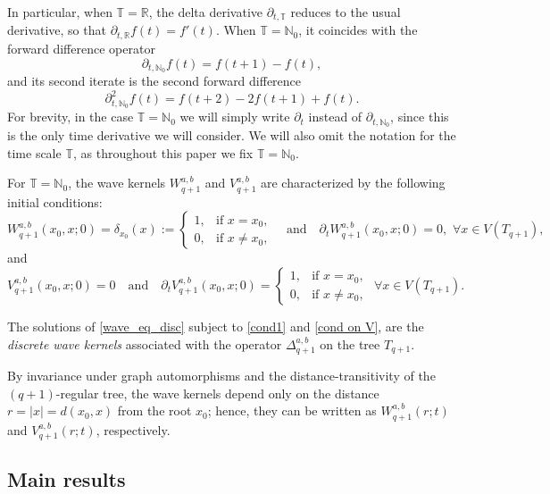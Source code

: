 \documentclass[12pt]{amsart}
\numberwithin{equation}{section}
\theoremstyle{boldremark}
\begin{document}
In particular, when $\mathbb{T} = \mathbb{R}$, the delta derivative $\partial_{t,\mathbb{T}}$ reduces to the usual derivative, so that $\partial_{t,\mathbb{R}} f(t) = f'(t)$. When $\mathbb{T} = \mathbb{N}_0$, it coincides with the forward difference operator
\[
\partial_{t,\mathbb{N}_0} f(t) = f(t+1) - f(t),
\]
and its second iterate is the second forward difference
\[
\partial_{t,\mathbb{N}_0}^2 f(t) = f(t+2) - 2f(t+1) + f(t).
\]
For brevity, in the case $\mathbb{T} = \mathbb{N}_0$ we will simply write $\partial_t$ instead of $\partial_{t,\mathbb{N}_0}$, since this is the only time derivative we will consider. We will also omit the notation for the time scale $\mathbb{T}$, as throughout this paper we fix $\mathbb{T} = \mathbb{N}_0$.

For $\mathbb{T}=\mathbb{N}_0$, the wave kernels $W_{q+1}^{a,b}$ and $V_{q+1}^{a,b}$ are characterized by the following initial conditions: 
\begin{equation}\label{cond1}
W_{q+1}^{a,b}(x_0, x; 0) =\delta_{x_0}(x):=
\begin{cases}
1, & \text{if } x = x_0, \\
0, & \text{if } x \neq x_0,
\end{cases} \quad \text{and}\quad \partial_t W_{q+1}^{a,b}(x_0, x; 0) = 0,\,\, \forall x\in V(T_{q+1}),
\end{equation}
and
\begin{equation}\label{cond on V}
V_{q+1}^{a,b}(x_0, x; 0) = 0 \quad \text{and}\quad  \partial_t  V_{q+1}^{a,b}(x_0, x; 0) =
\begin{cases}
1, & \text{if } x = x_0, \\
0, & \text{if } x \neq x_0,
\end{cases} \,\, \forall x\in V(T_{q+1}).
\end{equation}

The solutions of \eqref{wave_eq_disc} subject to \eqref{cond1} and \eqref{cond on V}, are the \textit{discrete wave kernels} associated with the operator $\Delta_{q+1}^{a,b}$ on the tree $T_{q+1}$.

By invariance under graph automorphisms and the distance-transitivity of the
$(q+1)$-regular tree, the wave kernels depend only on the distance $r=|x|=d(x_0,x)$ from the root $x_0$; hence, they can be written as $W_{q+1}^{a,b}(r;t)$ and $V_{q+1}^{a,b}(r;t)$, respectively.

\subsection{Main results}
\end{document}
